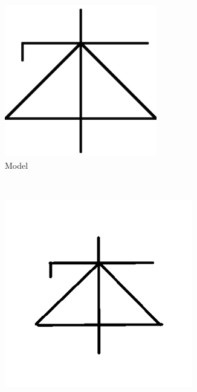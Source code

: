     \begin{figure}[h]
        \centering
                \begin{subfigure}[b]{0.2\textwidth}
                \centering
                \includegraphics[width=0.73\textwidth]{figures/Results/Sketches150f/Model.png}
                \caption{Model}
        \end{subfigure}\\
                \begin{subfigure}[b]{0.25\textwidth}
                \centering
                \includegraphics[width=0.9\textwidth]{figures/Results/Sketches150f/level1.png}

\end{subfigure}
\end{figure}
